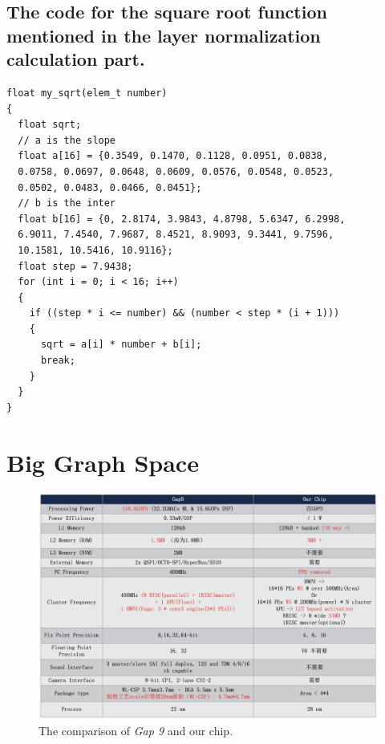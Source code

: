 \documentclass[default,iicol]{sn-jnl}%
\theoremstyle{thmstyleone}%
\theoremstyle{thmstyletwo}%
\theoremstyle{thmstylethree}%
\begin{document}
\begin{appendices}
\subsection{The code for the square root function mentioned in the layer normalization calculation part.}\label{secA3}
\begin{lstlisting}
float my_sqrt(elem_t number)
{
  float sqrt;
  // a is the slope
  float a[16] = {0.3549, 0.1470, 0.1128, 0.0951, 0.0838, 
  0.0758, 0.0697, 0.0648, 0.0609, 0.0576, 0.0548, 0.0523, 
  0.0502, 0.0483, 0.0466, 0.0451};
  // b is the inter
  float b[16] = {0, 2.8174, 3.9843, 4.8798, 5.6347, 6.2998, 
  6.9011, 7.4540, 7.9687, 8.4521, 8.9093, 9.3441, 9.7596, 
  10.1581, 10.5416, 10.9116};
  float step = 7.9438;
  for (int i = 0; i < 16; i++)
  {
    if ((step * i <= number) && (number < step * (i + 1)))
    {
      sqrt = a[i] * number + b[i];
      break;
    }
  }
}

\end{lstlisting}

\section{Big Graph Space}\label{secB}

\begin{figure}[H]
	\begin{center}
  		\includegraphics[width=1.0\linewidth]{Gap9andOurChip.png}
	\end{center}
   	\caption{The comparison of \textit{Gap 9} and our chip.}
	\label{fig:Gap_9_and_our_chip}
\end{figure}


\end{appendices}
\end{document}
